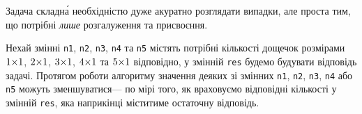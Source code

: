 \documentclass[14pt,a4paper]{extarticle}
\begin{document}
\Tutorial	
Задача складн\'{а} необхідністю дуже акуратно розглядати випадки, але проста тим, що потрібні \emph{лише} розгалуження та присвоєння.

Нехай змінні \texttt{n1}, \texttt{n2}, \texttt{n3}, \texttt{n4} та \texttt{n5} містять потрібні кількості дощечок розмірами $1{\times}1$, $2{\times}1$, $3{\times}1$, $4{\times}1$ та $5{\times}1$ відповідно, у змінній \texttt{res} будемо будувати відповідь задачі. Протягом роботи алгоритму значення деяких зі змінних \texttt{n1}, \texttt{n2}, \texttt{n3}, \texttt{n4} або \texttt{n5} можуть зменшуватися\nolinebreak[3] --- по мірі того, як враховуємо відповідні кількості у змінній \texttt{res}, яка наприкінці міститиме остаточну відповідь. 
\end{document}

